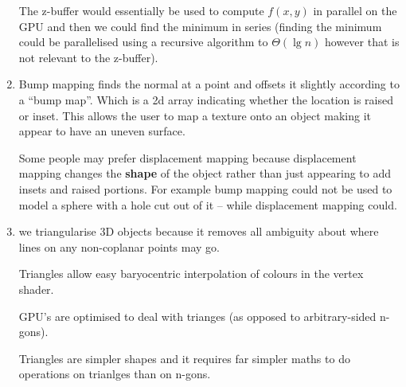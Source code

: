 \documentclass[10pt,\jkfside,a4paper]{article}
\begin{document}
\begin{enumerate}[label = (\alph*)]
The z-buffer would essentially be used to compute $f(x, y)$ in parallel on the GPU and then we could 
find the minimum in series (finding the minimum could be parallelised using a recursive algorithm to $\Theta(\lg n)$ 
however that is not relevant to the z-buffer).

\item Bump mapping finds the normal at a point and offsets it slightly according to a ``bump map''. Which is 
a 2d array indicating whether the location is raised or inset. This allows the user to map a texture onto an object 
making it appear to have an uneven surface.

Some people may prefer displacement mapping 
because displacement mapping changes the \textbf{shape} of the object rather than just appearing to add insets 
and raised portions. For example bump mapping could not be used to model a sphere with a hole cut out of it -- while 
displacement mapping could.

\item we triangularise 3D objects because it removes all ambiguity about where lines on any non-coplanar points 
may go.

Triangles allow easy baryocentric interpolation of colours in the vertex shader.

GPU's are optimised to deal with trianges (as opposed to arbitrary-sided n-gons).

Triangles are simpler shapes and it requires far simpler maths to do operations on trianlges than on n-gons.

\end{enumerate}
\end{document}
